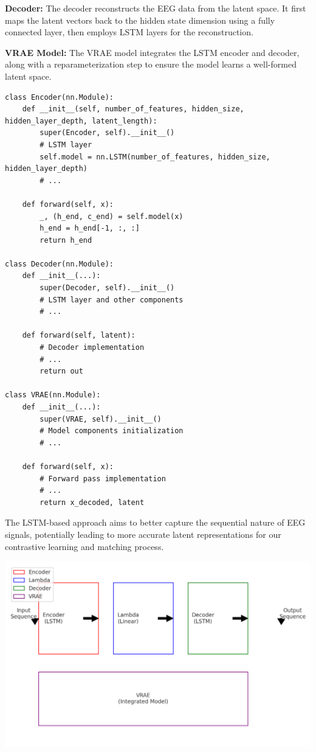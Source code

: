 \documentclass{article}
\begin{document}
\textbf{Decoder:}
The decoder reconstructs the EEG data from the latent space. It first maps the latent vectors back to the hidden state dimension using a fully connected layer, then employs LSTM layers for the reconstruction.

\textbf{VRAE Model:}
The VRAE model integrates the LSTM encoder and decoder, along with a reparameterization step to ensure the model learns a well-formed latent space.
\newpage

\begin{verbatim}
class Encoder(nn.Module):
    def __init__(self, number_of_features, hidden_size, hidden_layer_depth, latent_length):
        super(Encoder, self).__init__()
        # LSTM layer
        self.model = nn.LSTM(number_of_features, hidden_size, hidden_layer_depth)
        # ...

    def forward(self, x):
        _, (h_end, c_end) = self.model(x)
        h_end = h_end[-1, :, :]
        return h_end

class Decoder(nn.Module):
    def __init__(...):
        super(Decoder, self).__init__()
        # LSTM layer and other components
        # ...

    def forward(self, latent):
        # Decoder implementation
        # ...
        return out

class VRAE(nn.Module):
    def __init__(...):
        super(VRAE, self).__init__()
        # Model components initialization
        # ...

    def forward(self, x):
        # Forward pass implementation
        # ...
        return x_decoded, latent
\end{verbatim}
\newpage
The LSTM-based approach aims to better capture the sequential nature of EEG signals, potentially leading to more accurate latent representations for our contrastive learning and matching process.

\includegraphics[scale=0.5]{cs236.png}
\end{document}
